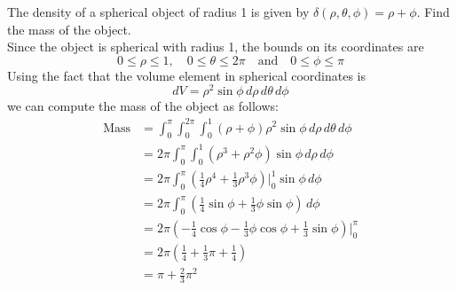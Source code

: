 \documentclass[handout]{ximera}
\begin{document}
\begin{example}[Example 4]
The density of a spherical object of radius 1 is given by $\delta(\rho, \theta, \phi) = \rho + \phi$. Find the mass of the object.\\
Since the object is spherical with radius 1, the bounds on its coordinates are
\[
0\leq \rho \leq 1, \quad 0 \leq \theta \leq 2\pi \quad \text{and} \quad 0\leq \phi \leq \pi
\]
Using the fact that the volume element in spherical coordinates is 
\[
dV = \rho^2 \sin\phi \, d\rho\, d\theta\, d\phi
\]
we can compute the mass of the object as follows:
\begin{align*}
\text{Mass} &= \int_0^\pi \int_0^{2\pi}  \int_0^1 (\rho + \phi) \rho^2 \sin \phi  \, d\rho\, d\theta\, d\phi\\
            &= 2\pi \int_0^\pi \int_0^1 (\rho^3 + \rho^2\phi)  \sin \phi  \, d\rho\, d\phi\\
            &= 2\pi \int_0^\pi \left(\tfrac14\rho^4 + \tfrac13\rho^3 \phi\right) \bigg|_0^1 \sin \phi \, d\phi\\
            &=2 \pi \int_0^\pi \left(\tfrac14 \sin \phi + \tfrac13 \phi \sin \phi\right) \, d\phi\\
            &= 2\pi \left(-\tfrac14 \cos \phi -\tfrac13 \phi \cos \phi + \tfrac13\sin\phi \right)\bigg|_0^\pi\\
            &=2\pi \left(\tfrac14 + \tfrac13 \pi +\tfrac14 \right)\\
            &= \pi + \tfrac{2 }{3}\pi^2
\end{align*}
\end{example}
            
\end{document}
